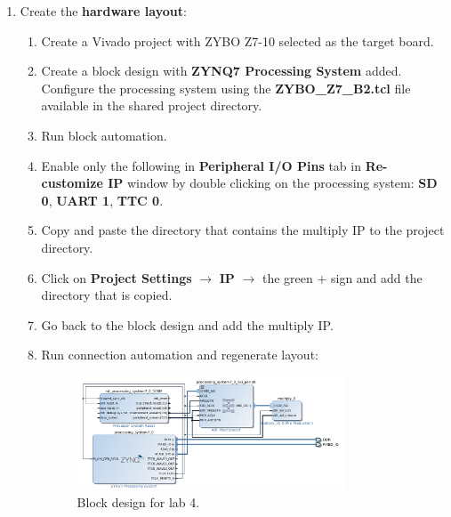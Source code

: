 \documentclass[11pt,letterpaper,titlepage]{article}
\begin{document}
\begin{enumerate}
    
    \item Create the \textbf{hardware layout}:
    
    \begin{enumerate}
        
        \item Create a Vivado project with ZYBO Z7-10 selected as the target board.
        
        \item Create a block design with \textbf{ZYNQ7 Processing System} added. Configure the processing system using the \textbf{ZYBO\_Z7\_B2.tcl} file available in the shared project directory.
        
        \item Run block automation.
        
        \item Enable only the following in \textbf{Peripheral I/O Pins} tab in \textbf{Re-customize IP} window by double clicking on the processing system: \textbf{SD 0}, \textbf{UART 1}, \textbf{TTC 0}.
        
        \item Copy and paste the directory that contains the multiply IP to the project directory.
        
        \item Click on \textbf{Project Settings} $\rightarrow$ \textbf{IP} $\rightarrow$ the green + sign and add the directory that is copied.
        
        \item Go back to the block design and add the multiply IP.
        
        \item Run connection automation and regenerate layout:
        
        \begin{figure}[ht]
            \centering
            \includegraphics[width=0.8\textwidth]{block.png}
            \caption{Block design for lab 4.}
        \end{figure}
        

\end{enumerate}
\end{enumerate}
\end{document}
